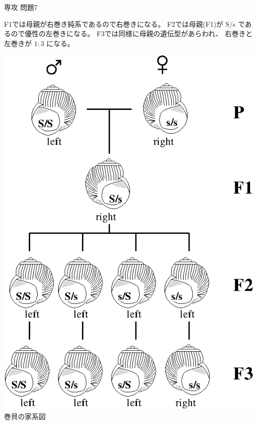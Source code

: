 \documentclass[fleqn]{jbook}
\begin{document}
\begin{answer}{専攻 問題7}{}
\begin{subanswers}
{\SubAnswer
  F1では母親が右巻き純系であるので右巻きになる。
  F2では母親(F1)が S/s であるので優性の左巻きになる。
  F3では同様に母親の遺伝型があらわれ、
  右巻きと左巻きが $1:3$ になる。\\
  }\parbox[t]{75mm}{\vspace*{-10mm}
  \begin{center}
    \mbox{\includegraphics[clip]{1996phy7-2.eps}}\\
    巻貝の家系図
  \end{center}}




\end{subanswers}
\end{answer}
\end{document}
